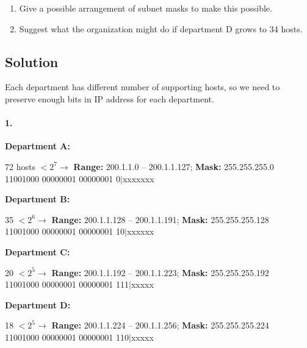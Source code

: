 \documentclass[11pt]{article}
\begin{document}
    \begin{enumerate}
        \item Give a possible arrangement of subnet masks to make this possible.
        \item Suggest what the organization might do if department D grows to 34 hosts.
    \end{enumerate}

    \subsection{Solution}
    Each department has different number of supporting hosts,
    so we need to preserve enough bits in IP address for each department.

    \paragraph{1.}

    \textbf{Department A:}
    \begin{center}
        72 hosts $< 2^7 \longrightarrow$ \textbf{Range:} 200.1.1.0 -- 200.1.1.127; \textbf{Mask:} 255.255.255.0 \\
        11001000 00000001 00000001 0$\mid$xxxxxxx \\
    \end{center}

    \textbf{Department B:}
    \begin{center}
        35 $< 2^6 \longrightarrow$ \textbf{Range:} 200.1.1.128 -- 200.1.1.191; \textbf{Mask:} 255.255.255.128 \\
        11001000 00000001 00000001 10$\mid$xxxxxx \\
    \end{center}

    \textbf{Department C:}
    \begin{center}
        20 $< 2^5 \longrightarrow$ \textbf{Range:} 200.1.1.192 -- 200.1.1.223; \textbf{Mask:} 255.255.255.192 \\
        11001000 00000001 00000001 111$\mid$xxxxx\\
    \end{center}

    \textbf{Department D:}
    \begin{center}
        18 $< 2^5 \longrightarrow$ \textbf{Range:} 200.1.1.224 -- 200.1.1.256; \textbf{Mask:} 255.255.255.224 \\
        11001000 00000001 00000001 110$\mid$xxxxx \\
    \end{center}
\end{document}
